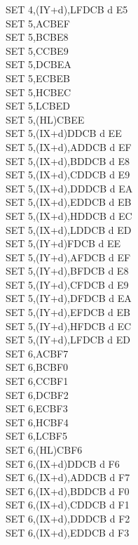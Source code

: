 \documentclass[12pt,twoside,openright,a4paper]{book}
\begin{document}
\begin{multicols}{3}
{\begin{tabbing}
		SET 4,(IY+d),L\UNDOC\>FDCB d E5\\
		SET 5,A\>CBEF\\
		SET 5,B\>CBE8\\
		SET 5,C\>CBE9\\
		SET 5,D\>CBEA\\
		SET 5,E\>CBEB\\
		SET 5,H\>CBEC\\
		SET 5,L\>CBED\\
		SET 5,(HL)\>CBEE\\
		SET 5,(IX+d)\>DDCB d EE\\
		SET 5,(IX+d),A\UNDOC\>DDCB d EF\\
		SET 5,(IX+d),B\UNDOC\>DDCB d E8\\
		SET 5,(IX+d),C\UNDOC\>DDCB d E9\\
		SET 5,(IX+d),D\UNDOC\>DDCB d EA\\
		SET 5,(IX+d),E\UNDOC\>DDCB d EB\\
		SET 5,(IX+d),H\UNDOC\>DDCB d EC\\
		SET 5,(IX+d),L\UNDOC\>DDCB d ED\\
		SET 5,(IY+d)\>FDCB d EE\\
		SET 5,(IY+d),A\UNDOC\>FDCB d EF\\
		SET 5,(IY+d),B\UNDOC\>FDCB d E8\\
		SET 5,(IY+d),C\UNDOC\>FDCB d E9\\
		SET 5,(IY+d),D\UNDOC\>FDCB d EA\\
		SET 5,(IY+d),E\UNDOC\>FDCB d EB\\
		SET 5,(IY+d),H\UNDOC\>FDCB d EC\\
		SET 5,(IY+d),L\UNDOC\>FDCB d ED\\
		SET 6,A\>CBF7\\
		SET 6,B\>CBF0\\
		SET 6,C\>CBF1\\
		SET 6,D\>CBF2\\
		SET 6,E\>CBF3\\
		SET 6,H\>CBF4\\
		SET 6,L\>CBF5\\
		SET 6,(HL)\>CBF6\\
		SET 6,(IX+d)\>DDCB d F6\\
		SET 6,(IX+d),A\UNDOC\>DDCB d F7\\
		SET 6,(IX+d),B\UNDOC\>DDCB d F0\\
		SET 6,(IX+d),C\UNDOC\>DDCB d F1\\
		SET 6,(IX+d),D\UNDOC\>DDCB d F2\\
		SET 6,(IX+d),E\UNDOC\>DDCB d F3\\

\end{tabbing}}
\end{multicols}
\end{document}
